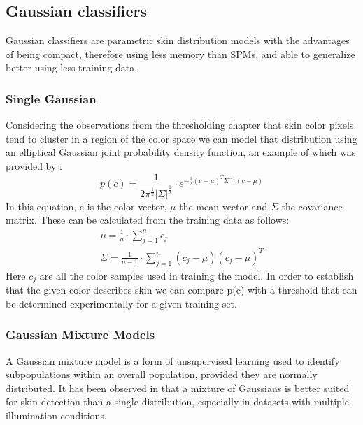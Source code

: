 \documentclass[12pt]{report}
\begin{document}
	\subsection{Gaussian classifiers}
	Gaussian classifiers are parametric skin distribution models with the advantages of being compact, therefore using less memory than SPMs, and able to generalize better using less training data\cite{survey_skin_color_modeling}.
	
	\subsubsection{Single Gaussian}
	Considering the observations from the thresholding chapter that skin color pixels tend to cluster in a region of the color space we can model that distribution using an elliptical Gaussian joint probability density function, an example of which was provided by \cite{survey_skin_color_modeling}:
	\begin{equation}
	p(c) = \frac{1}{2\pi^\frac{1}{2}|\Sigma|^\frac{1}{2}} \cdot e^{-\frac{1}{2}(c - \mu)^T\Sigma^{-1}(c - \mu)}
	\end{equation}
	In this equation, c is the color vector, \(\mu\) the mean vector and \(\Sigma\) the covariance matrix. These can be calculated from the training data as follows:
	\begin{equation}
	\begin{split}
	\mu = \frac{1}{n} \cdot \sum_{j=1}^{n} c_j \\
	\Sigma = \frac{1}{n - 1} \cdot \sum_{j=1}^{n}(c_j - \mu)(c_j - \mu)^T
	\end{split}
	\end{equation}
	Here \(c_j\) are all the color samples used in training the model. In order to establish that the given color describes skin we can compare p(c) with a threshold that can be determined experimentally for a given training set.
	
	\subsubsection{Gaussian Mixture Models}
	A Gaussian mixture model is a form of unsupervised learning used to identify subpopulations within an overall population, provided they are normally distributed\cite{gaussian_mixtures}. It has been observed in \cite{Yang99gaussianmixture} that a mixture of Gaussians is better suited for skin detection than a single distribution, especially in datasets with multiple illumination conditions.
	
\end{document}
